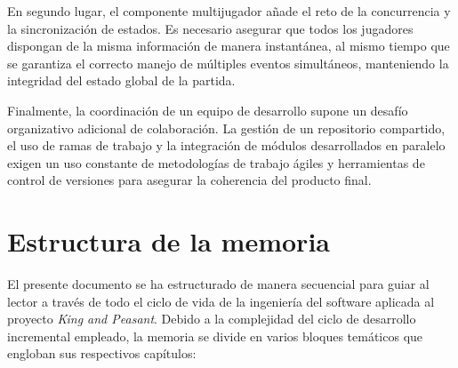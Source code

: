 En segundo lugar, el componente multijugador añade el reto de la concurrencia y la sincronización de estados. Es necesario asegurar que todos los jugadores dispongan de la misma información de manera instantánea, al mismo tiempo que se garantiza el correcto manejo de múltiples eventos simultáneos, manteniendo la integridad del estado global de la partida.

Finalmente, la coordinación de un equipo de desarrollo supone un desafío organizativo adicional de colaboración. La gestión de un repositorio compartido, el uso de ramas de trabajo y la integración de módulos desarrollados en paralelo exigen un uso constante de metodologías de trabajo ágiles y herramientas de control de versiones para asegurar la coherencia del producto final.

\section{Estructura de la memoria}

El presente documento se ha estructurado de manera secuencial para guiar al lector a través de todo el ciclo de vida de la ingeniería del software aplicada al proyecto \textit{King and Peasant}. Debido a la complejidad del ciclo de desarrollo incremental empleado, la memoria se divide en varios bloques temáticos que engloban sus respectivos capítulos:

